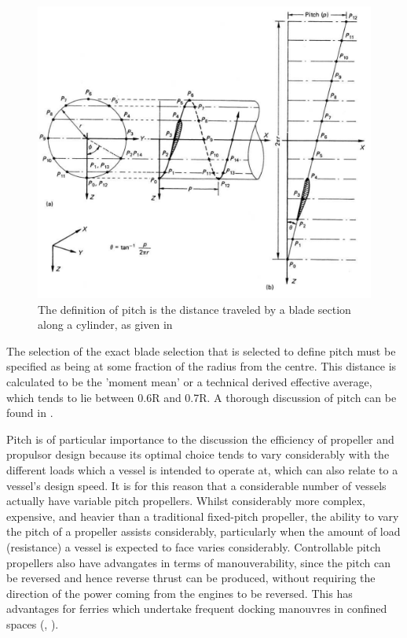 \documentclass{article}\usepackage[]{graphicx}\usepackage[]{color}
\begin{document}
\begin{figure}
\includegraphics[width=\textwidth]{PitchDefinition.png}
\caption{The definition of pitch is the distance traveled by a blade section along a cylinder, as given in \parencite{carlton2007}}
\label{fig:PitchDefinition.png}
\end{figure}

The selection of the exact blade selection that is selected to define pitch must be specified as being at some fraction of the radius from the centre.  This distance is calculated to be the 'moment mean' or a technical derived effective average, which tends to lie between 0.6R and 0.7R.  A thorough discussion of pitch can be found in \cite[35-37]{carlton2007}.

Pitch is of particular importance to the discussion the efficiency of propeller and propulsor design because its optimal choice tends to vary considerably with the different loads which a vessel is intended to operate at, which can also relate to a vessel's design speed.  It is for this reason that a considerable number of vessels actually have variable pitch propellers.  Whilst considerably more complex, expensive, and heavier than a traditional fixed-pitch propeller, the ability to vary the pitch of a propeller assists considerably, particularly when the amount of load (resistance) a vessel is expected to face varies considerably.  Controllable pitch propellers also have advangates in terms of manouverability, since the pitch can be reversed and hence reverse thrust can be produced, without requiring the direction of the power coming from the engines to be reversed.  This has advantages for ferries which undertake frequent docking manouvres in confined spaces (\cite{MAN2017}, \cite{lewis1988}).
\end{document}
